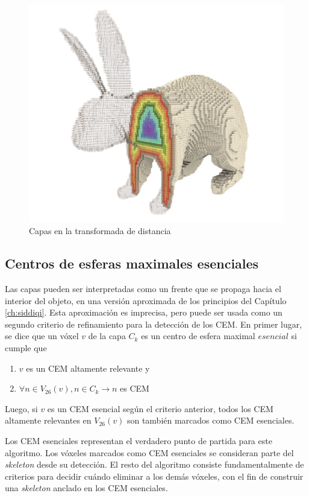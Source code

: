 \begin{figure}[H]\centering
\includegraphics[width=0.7\linewidth]{images/arcelli_layers}
\caption{Capas en la transformada de distancia}
\label{fig:arcelli_layers}
\end{figure}

\subsection{Centros de esferas maximales esenciales}
\label{ssec:core_cmb}

Las capas pueden ser interpretadas como un frente que se propaga hacia el interior del objeto, en una versión aproximada de los principios del Capítulo \ref{ch:siddiqi}. Esta aproximación es imprecisa, pero puede ser usada como un segundo criterio de refinamiento para la detección de los CEM. En primer lugar, se dice que un vóxel $v$ de la capa $C_k$ es un centro de esfera maximal $esencial$ si cumple que

\begin{enumerate}
\item $v$ es un CEM altamente relevante y
\item $\forall n \in V_{26}(v), n \in C_k \rightarrow n$ es CEM
\end{enumerate}

Luego, si $v$ es un CEM esencial según el criterio anterior, todos los CEM altamente relevantes en $V_{26}(v)$ son también marcados como CEM esenciales.

Los CEM esenciales representan el verdadero punto de partida para este algoritmo. Los vóxeles marcados como CEM esenciales se consideran parte del \textit{skeleton} desde su detección. El resto del algoritmo consiste fundamentalmente de criterios para decidir cuándo eliminar a los demás vóxeles, con el fin de construir una \textit{skeleton} anclado en los CEM esenciales.

